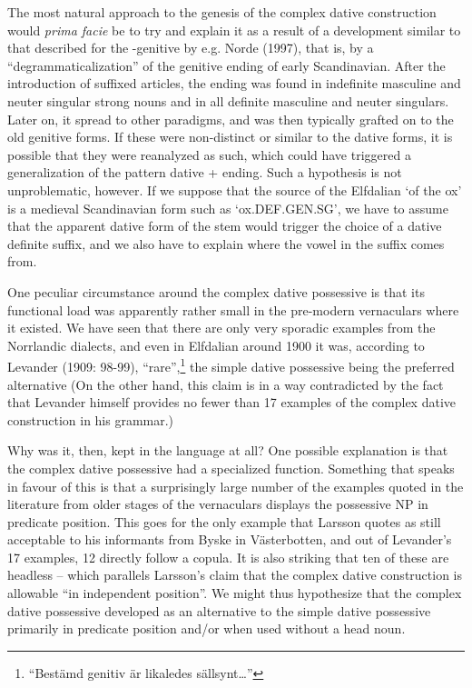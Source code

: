 The most natural approach to the genesis of the complex dative construction would \textit{prima facie} be to try and explain it as a result of a development similar to that described for the -genitive by e.g. Norde (1997), that is, by a “degrammaticalization” of the genitive ending of early Scandinavian. After the introduction of suffixed articles, the ending was found in indefinite masculine and neuter singular strong nouns and in all definite masculine and neuter singulars. Later on, it spread to other paradigms, and was then typically grafted on to the old genitive forms. If these were non-distinct or similar to the dative forms, it is possible that they were reanalyzed as such, which could have triggered a generalization of the pattern dative + ending. Such a hypothesis is not unproblematic, however. If we suppose that the source of the Elfdalian  ‘of the ox’ is a medieval Scandinavian form such as  ‘ox.DEF.GEN.SG’, we have to assume that the apparent dative form of the stem would trigger the choice of a dative definite suffix, and we also have to explain where the vowel in the suffix comes from. 

One peculiar circumstance around the complex dative possessive is that its functional load was apparently rather small in the pre-modern vernaculars where it existed. We have seen that there are only very sporadic examples from the Norrlandic dialects, and even in Elfdalian around 1900 it was, according to Levander (1909: 98-99), “rare”,\footnote{ “Bestämd genitiv är likaledes sällsynt…”} the simple dative possessive being the preferred alternative (On the other hand, this claim is in a way contradicted by the fact that Levander himself provides no fewer than 17 examples of the complex dative construction in his grammar.) 

Why was it, then, kept in the language at all? One possible explanation is that the complex dative possessive had a specialized function. Something that speaks in favour of this is that a surprisingly large number of the examples quoted in the literature from older stages of the vernaculars displays the possessive NP in predicate position. This goes for the only example that Larsson quotes as still acceptable to his informants from Byske in Västerbotten, and out of Levander’s 17 examples, 12 directly follow a copula. It is also striking that ten of these are headless – which parallels Larsson’s claim that the complex dative construction is allowable “in independent position”. We might thus hypothesize that the complex dative possessive developed as an alternative to the simple dative possessive primarily in predicate position and/or when used without a head noun. 

